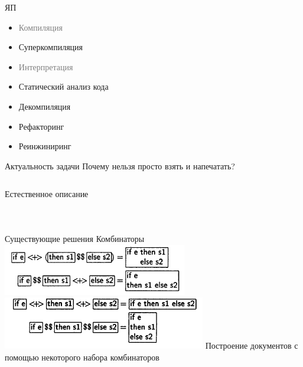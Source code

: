 \documentclass{beamer}
\begin{document}
\begin{frame}{ЯП}
	\begin{itemize}
		\item \textcolor{gray}{Компиляция}
		\item Суперкомпиляция
		\item \textcolor{gray}{Интерпретация}
		\item Статический анализ кода
		\item Декомпиляция
		\item Рефакторинг
		\item Реинжиниринг
	\end{itemize}
\end{frame}

\begin{frame}{Актуальность задачи}
	Почему нельзя просто взять и напечатать?
	\vspace{1cm}
	\pause
	\inputminted{c}{codes/wikiExUnfor.c}
\end{frame}

\begin{frame}[fragile]{Естественное описание}
	\begin{block}{}
		\inputminted{pascal}{codes/if1.pas}
	\end{block}
	\begin{block}{}
		\inputminted{pascal}{codes/if2.pas}
	\end{block}
	\begin{block}{}
		\inputminted{pascal}{codes/if3.pas}
	\end{block}
\end{frame}

\begin{frame}{Существующие решения}
	Комбинаторы
	\vspace{0.7cm}	
	\includegraphics[width = 1\linewidth]{images/a1.png}
	\includegraphics[width = 1\linewidth]{images/a2.png}
	\vspace{0.7cm}
	Построение документов с помощью некоторого набора комбинаторов
\end{frame}
\end{document}
